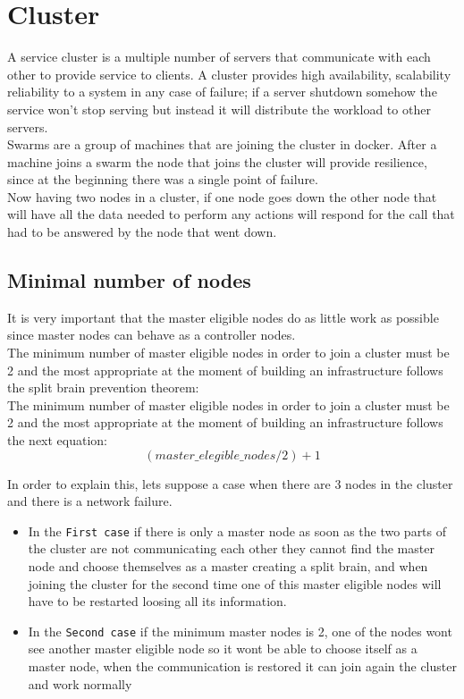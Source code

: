 \section{Cluster}

A service cluster is a multiple number of servers that communicate with each other to provide service to clients. A cluster provides high availability, scalability reliability to a system in any case of failure; if a server shutdown somehow the service won’t stop serving but instead it will distribute the workload to other servers.\\

Swarms are a group of machines that are joining the cluster in docker. After a machine joins a swarm the node that joins the cluster will provide resilience, since at the beginning there was a single point of failure.\\

Now having two nodes in a cluster, if one node goes down the other node that will have all the data needed to perform any actions will respond for the call that had to be answered by the node that went down.\\

\subsection{Minimal number of nodes}

It is very important that the master eligible nodes do as little work as possible since master nodes can behave as a controller nodes.\\

The minimum number of master eligible nodes in order to join a cluster must be 2 and the most appropriate at the moment of building an infrastructure follows the split brain prevention theorem:\\

The minimum number of master eligible nodes in order to join a cluster must be 2 and the most appropriate at the moment of building an infrastructure follows the next equation:
\begin{equation}
(master\_elegible\_nodes / 2)+1
\end{equation}

In order to explain this, lets suppose a case when there are 3 nodes in the cluster and there is a network failure.\\
\begin{itemize}
\item In the \texttt{First case} if there is only a master node as soon as the two parts of the cluster are not communicating each other they cannot find the master node and choose themselves as a master creating a split brain, and when joining the cluster for the second time  one of this master eligible nodes will have to be restarted loosing all its information.
\item In the \texttt{Second case} if the minimum master nodes is 2, one of the nodes wont see another master eligible node so it wont be able to choose itself as a master node, when the communication is restored it can join again the cluster and work normally 
\end{itemize}

